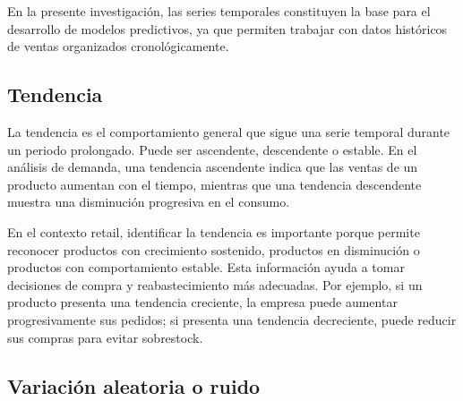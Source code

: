 En la presente investigación, las series temporales constituyen la base para el desarrollo de modelos predictivos, ya que permiten trabajar con datos históricos de ventas organizados cronológicamente.

\subsection{Tendencia}

La tendencia es el comportamiento general que sigue una serie temporal durante un periodo prolongado. Puede ser ascendente, descendente o estable. En el análisis de demanda, una tendencia ascendente indica que las ventas de un producto aumentan con el tiempo, mientras que una tendencia descendente muestra una disminución progresiva en el consumo.

En el contexto retail, identificar la tendencia es importante porque permite reconocer productos con crecimiento sostenido, productos en disminución o productos con comportamiento estable. Esta información ayuda a tomar decisiones de compra y reabastecimiento más adecuadas. Por ejemplo, si un producto presenta una tendencia creciente, la empresa puede aumentar progresivamente sus pedidos; si presenta una tendencia decreciente, puede reducir sus compras para evitar sobrestock.





\subsection{Variación aleatoria o ruido}

